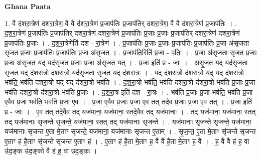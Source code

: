 \documentclass[17pt]{extarticle}
\begin{document}
\textbf{Ghana Paata } \newline

1. वै द॑शरा॒त्रेण॑ दशरा॒त्रेण॒ वै वै द॑शरा॒त्रेण॑ प्र॒जाप॑तिः प्र॒जाप॑तिर् दशरा॒त्रेण॒ वै वै द॑शरा॒त्रेण॑ प्र॒जाप॑तिः । . द॒श॒रा॒त्रेण॑ प्र॒जाप॑तिः प्र॒जाप॑तिर् दशरा॒त्रेण॑ दशरा॒त्रेण॑ प्र॒जाप॑तिः प्र॒जाः प्र॒जाः प्र॒जाप॑तिर् दशरा॒त्रेण॑ दशरा॒त्रेण॑ प्र॒जाप॑तिः प्र॒जाः । . द॒श॒रा॒त्रेणेति॑ दश - रा॒त्रेण॑ । . प्र॒जाप॑तिः प्र॒जाः प्र॒जाः प्र॒जाप॑तिः प्र॒जाप॑तिः प्र॒जा अ॑सृजता सृजत प्र॒जाः प्र॒जाप॑तिः प्र॒जाप॑तिः प्र॒जा अ॑सृजत । . प्र॒जाप॑ति॒रिति॑ प्र॒जा - प॒तिः॒ । . प्र॒जा अ॑सृजता सृजत प्र॒जाः प्र॒जा अ॑सृजत॒ यद् यद॑सृजत प्र॒जाः प्र॒जा अ॑सृजत॒ यत् । . प्र॒जा इति॑ प्र - जाः । . अ॒सृ॒ज॒त॒ यद् यद॑सृजता सृजत॒ यद् द॑शरा॒त्रो द॑शरा॒त्रो यद॑सृजता सृजत॒ यद् द॑शरा॒त्रः । . यद् द॑शरा॒त्रो द॑शरा॒त्रो यद् यद् द॑शरा॒त्रो भव॑ति॒ भव॑ति दशरा॒त्रो यद् यद् द॑शरा॒त्रो भव॑ति । . द॒श॒रा॒त्रो भव॑ति॒ भव॑ति दशरा॒त्रो द॑शरा॒त्रो भव॑ति प्र॒जाः प्र॒जा भव॑ति दशरा॒त्रो द॑शरा॒त्रो भव॑ति प्र॒जाः । . द॒श॒रा॒त्र इति॑ दश - रा॒त्रः । . भव॑ति प्र॒जाः प्र॒जा भव॑ति॒ भव॑ति प्र॒जा ए॒वैव प्र॒जा भव॑ति॒ भव॑ति प्र॒जा ए॒व । . प्र॒जा ए॒वैव प्र॒जाः प्र॒जा ए॒व तत् तदे॒व प्र॒जाः प्र॒जा ए॒व तत् । . प्र॒जा इति॑ प्र - जाः । . ए॒व तत् तदे॒वैव तद् यज॑माना॒ यज॑माना॒ स्तदे॒वैव तद् यज॑मानाः । . तद् यज॑माना॒ यज॑माना॒ स्तत् तद् यज॑मानाः सृजन्ते सृजन्ते॒ यज॑माना॒ स्तत् तद् यज॑मानाः सृजन्ते । . यज॑मानाः सृजन्ते सृजन्ते॒ यज॑माना॒ यज॑मानाः सृजन्त ए॒ता मे॒ताꣳ सृ॑जन्ते॒ यज॑माना॒ यज॑मानाः सृजन्त ए॒ताम् । . सृ॒ज॒न्त॒ ए॒ता मे॒ताꣳ सृ॑जन्ते सृजन्त ए॒ताꣳ ह॑ है॒ताꣳ सृ॑जन्ते सृजन्त ए॒ताꣳ ह॑ । . ए॒ताꣳ ह॑ है॒ता मे॒ताꣳ ह॒ वै वै है॒ता मे॒ताꣳ ह॒ वै । . ह॒ वै वै ह॑ ह॒ वा उ॑द॒ङ्क उ॑द॒ङ्को वै ह॑ ह॒ वा उ॑द॒ङ्कः । \newline
\end{document}
